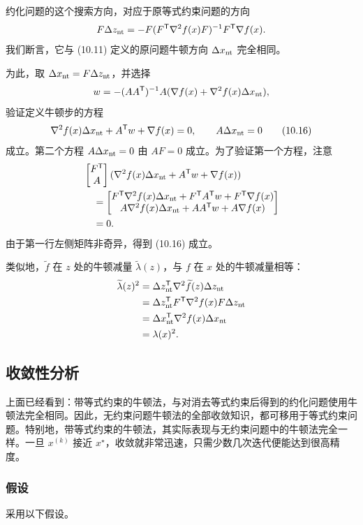 约化问题的这个搜索方向，对应于原等式约束问题的方向
\[F\Delta z_{\rm nt}=-F(F^\mathsf T\nabla^2f(x)F)^{-1}F^\mathsf T\nabla f(x).\]
我们断言，它与 (10.11) 定义的原问题牛顿方向 $\Delta x_{\rm nt}$ 完全相同。

为此，取 $\Delta x_{\rm nt}=F\Delta z_{\rm nt}$，并选择
\[w=-(AA^\mathsf T)^{-1}A(\nabla f(x)+\nabla^2f(x)\Delta x_{\rm nt}),\]
验证定义牛顿步的方程
\begin{equation}\nabla^2f(x)\Delta x_{\rm nt}+A^\mathsf T w+\nabla f(x)=0,\qquad A\Delta x_{\rm nt}=0\tag{10.16}\end{equation}
成立。第二个方程 $A\Delta x_{\rm nt}=0$ 由 $AF=0$ 成立。为了验证第一个方程，注意
\[\begin{aligned}
&\begin{bmatrix}F^\mathsf T\\A\end{bmatrix}(\nabla^2f(x)\Delta x_{\rm nt}+A^\mathsf T w+\nabla f(x))\\
&\quad=\begin{bmatrix}F^\mathsf T\nabla^2f(x)\Delta x_{\rm nt}+F^\mathsf T A^\mathsf T w+F^\mathsf T\nabla f(x)\\A\nabla^2f(x)\Delta x_{\rm nt}+AA^\mathsf T w+A\nabla f(x)\end{bmatrix}\\
&\quad=0.
\end{aligned}\]
由于第一行左侧矩阵非奇异，得到 (10.16) 成立。

类似地，$\widetilde f$ 在 $z$ 处的牛顿减量 $\widetilde\lambda(z)$，与 $f$ 在 $x$ 处的牛顿减量相等：
\[\begin{aligned}
\widetilde\lambda(z)^2&=\Delta z_{\rm nt}^\mathsf T\nabla^2\widetilde f(z)\Delta z_{\rm nt}\\
&=\Delta z_{\rm nt}^\mathsf T F^\mathsf T\nabla^2f(x)F\Delta z_{\rm nt}\\
&=\Delta x_{\rm nt}^\mathsf T\nabla^2f(x)\Delta x_{\rm nt}\\
&=\lambda(x)^2.
\end{aligned}\]

\subsection{收敛性分析}
上面已经看到：带等式约束的牛顿法，与对消去等式约束后得到的约化问题使用牛顿法完全相同。因此，无约束问题牛顿法的全部收敛知识，都可移用于等式约束问题。特别地，带等式约束的牛顿法，其实际表现与无约束问题中的牛顿法完全一样。一旦 $x^{(k)}$ 接近 $x^\star$，收敛就非常迅速，只需少数几次迭代便能达到很高精度。

\subsubsection*{假设}
采用以下假设。

